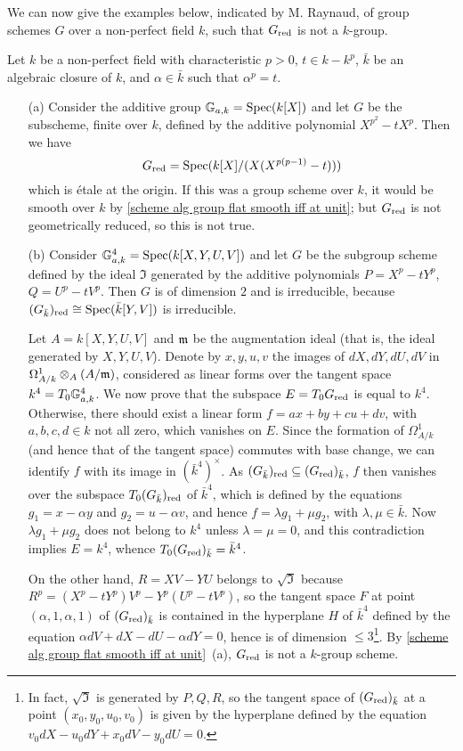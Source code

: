 We can now give the examples below, indicated by M. Raynaud, of group schemes $G$ over a non-perfect field $k$, such that $G_{\mathrm{red}}$ is not a $k$-group.

\begin{example}\label{scheme alg group G_red not group example}
Let $k$ be a non-perfect field with characteristic $p>0$, $t\in k-k^p$, $\bar{k}$ be an algebraic closure of $k$, and $\alpha\in\bar{k}$ such that $\alpha^p=t$.
\begin{enumerate}
    \item[(a)] Consider the additive group $\mathbb{G}_{a,k}=\mathrm{Spec}(k[X])$ and let $G$ be the subscheme, finite over $k$, defined by the additive polynomial $X^{p^2}-tX^p$. Then we have
    \[G_{\mathrm{red}}=\mathrm{Spec}(k[X]/(X(X^{p(p-1)}-t)))\]
    which is \'etale at the origin. If this was a group scheme over $k$, it would be smooth over $k$ by \cref{scheme alg group flat smooth iff at unit}; but $G_{\mathrm{red}}$ is not geometrically reduced, so this is not true.
    \item[(b)] Consider $\mathbb{G}_{a,k}^4=\mathrm{Spec}(k[X,Y,U,V])$ and let $G$ be the subgroup scheme defined by the ideal $\mathfrak{I}$ generated by the additive polynomials $P=X^p-tY^p$, $Q=U^p-tV^p$. Then $G$ is of dimension $2$ and is irreducible, because $(G_{\bar{k}})_{\mathrm{red}}\cong\mathrm{Spec}(\bar{k}[Y,V])$ is irreducible.\par
    Let $A=k[X,Y,U,V]$ and $\mathfrak{m}$ be the augmentation ideal (that is, the ideal generated by $X,Y,U,V$). Denote by $x,y,u,v$ the images of $dX,dY,dU,dV$ in $\Omega_{A/k}^1\otimes_A(A/\mathfrak{m})$, considered as linear forms over the tangent space $k^4=T_0\mathbb{G}_{a,k}^4$. We now prove that the subspace $E=T_0G_{\mathrm{red}}$ is equal to $k^4$. Otherwise, there should exist a linear form $f=ax+by+cu+dv$, with $a,b,c,d\in k$ not all zero, which vanishes on $E$. Since the formation of $\Omega_{A/k}^1$ (and hence that of the tangent space) commutes with base change, we can identify $f$ with its image in $(\bar{k}^4)^\times$. As $(G_{\bar{k}})_{\mathrm{red}}\subseteq(G_{\mathrm{red}})_{\bar{k}}$, $f$ then vanishes over the subspace $T_0(G_{\bar{k}})_{\mathrm{red}}$ of $\bar{k}^4$, which is defined by the equations $g_1=x-\alpha y$ and $g_2=u-\alpha v$, and hence $f=\lambda g_1+\mu g_2$, with $\lambda,\mu\in\bar{k}$. Now $\lambda g_1+\mu g_2$ does not belong to $k^4$ unless $\lambda=\mu=0$, and this contradiction implies $E=k^4$, whence $T_0(G_{\mathrm{red}})_{\bar{k}}=\bar{k}^4$.\par
    On the other hand, $R=XV-YU$ belongs to $\sqrt{\mathfrak{I}}$ because $R^p=(X^p-tY^p)V^p-Y^p(U^p-tV^p)$, so the tangent space $F$ at point $(\alpha,1,\alpha,1)$ of $(G_{\mathrm{red}})_{\bar{k}}$ is contained in the hyperplane $H$ of $\bar{k}^4$ defined by the equation $\alpha dV+dX-dU-\alpha dY=0$, hence is of dimension $\leq 3$\footnote{In fact, $\sqrt{\mathfrak{I}}$ is generated by $P,Q,R$, so the tangent space of $(G_{\mathrm{red}})_{\bar{k}}$ at a point $(x_0,y_0,u_0,v_0)$ is given by the hyperplane defined by the equation $v_0dX-u_0dY+x_0dV-y_0dU=0$.}. By \cref{scheme alg group flat smooth iff at unit}~(a), $G_{\mathrm{red}}$ is not a $k$-group scheme.
\end{enumerate}
\end{example}

